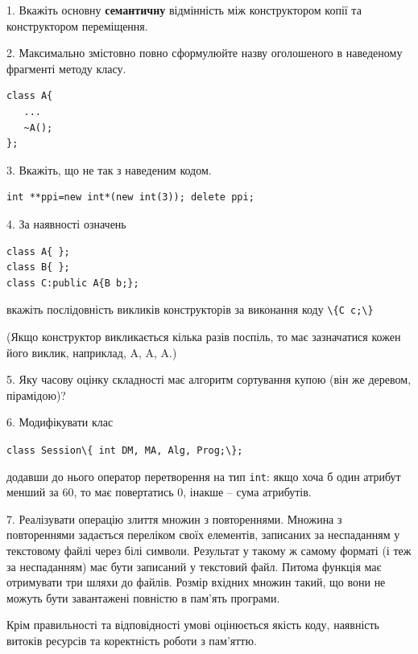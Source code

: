 \documentclass[12pt, ukrainian]{article}
\def\code#1{\Verb!#1!}
\begin{document}
{%
1. Вкажіть основну \textbf{семантичну} відмінність між конструктором копії та конструктором переміщення.%
\par
\vspace{2mm}
2. Максимально змістовно повно сформулюйте назву оголошеного в наведеному фрагменті методу класу.
\vspace{-3mm}
\begin{verbatim}class A{
   ...
   ~A();
};\end{verbatim}
\vspace{-3mm}
\par
\vspace{2mm}
3. Вкажіть, що не так з наведеним кодом.
\vspace{-3mm}
\begin{verbatim}int **ppi=new int*(new int(3)); delete ppi;\end{verbatim}
\vspace{-3mm}
\par
\vspace{2mm}
4. За наявності означень
\vspace{-3mm}
\begin{verbatim}
class A{ };
class B{ };
class C:public A{B b;};\end{verbatim}
\vspace{-3mm}
вкажіть послідовність викликів конструкторів за виконання коду \code{\{C c;\}} 

(Якщо конструктор викликається кілька разів поспіль, то має зазначатися кожен його виклик, наприклад, A, A, A.)

\vspace{2mm}
5. Яку часову оцінку складності має алгоритм сортування купою (він же деревом, пірамідою)?
\par
\vspace{2mm}
6. Модифікувати клас 

\qquad\code{class Session\{ int DM, MA, Alg, Prog;\};} 


додавши до нього оператор перетворення на тип \code{int}: якщо хоча б один атрибут менший за 60, то має повертатись 0, інакше -- сума атрибутів.%
\par
\vspace{2mm}
7. 
Реалізувати операцію злиття множин з повтореннями. Множина з повтореннями задається переліком своїх елементів, записаних за неспаданням у текстовому файлі через білі символи. Результат у такому ж самому форматі (і теж за неспаданням) має бути записаний у текстовий файл. Питома функція має отримувати три шляхи до файлів. Розмір вхідних множин такий, що вони не можуть бути завантажені повністю в пам’ять програми.

Крім правильності та відповідності умові оцінюється якість коду, наявність витоків ресурсів та коректність роботи з пам'яттю. 

}
\end{document}

